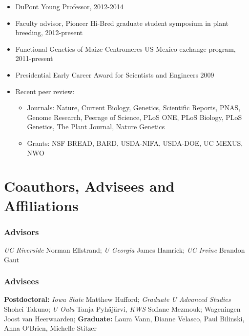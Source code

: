 \documentclass[11pt]{article}
\begin{document}
\begin{itemize} \setlength{\itemsep}{0pt} \setlength{\parskip}{2pt} \setlength{\parsep}{0pt}

\item DuPont Young Professor, 2012-2014

\item Faculty advisor, Pioneer Hi-Bred graduate student symposium in plant breeding, 2012-present


\item Functional Genetics of Maize Centromeres US-Mexico exchange program, 2011-present

\item Presidential Early Career Award for Scientists and Engineers 2009

\item Recent peer review: 
\begin{itemize} 
\item Journals: Nature, Current Biology, Genetics, Scientific Reports, PNAS, Genome Research, Peerage of Science, PLoS ONE, PLoS Biology, PLoS Genetics, The Plant Journal, Nature Genetics

\item Grants: NSF BREAD, BARD, USDA-NIFA, USDA-DOE, UC MEXUS, NWO
\end{itemize}
\end{itemize}

\section{Coauthors, Advisees and Affiliations}

\subsubsection*{Advisors}
\begin{small}
\emph{UC Riverside} Norman Ellstrand; \emph{U Georgia} James Hamrick; \emph{UC Irvine} Brandon Gaut 
\end{small}

\subsubsection*{Advisees}
\begin{small}
{\bf Postdoctoral:} \emph{Iowa State} Matthew Hufford; \emph{Graduate U Advanced Studies} Shohei Takuno; \emph{U Oulu} Tanja Pyh\"aj\"arvi, \emph{KWS} Sofiane Mezmouk; {Wageningen} Joost van Heerwaarden; {\bf Graduate:} Laura Vann, Dianne Velasco, Paul Bilinski, Anna O'Brien, Michelle Stitzer
\end{small}
\end{document}
